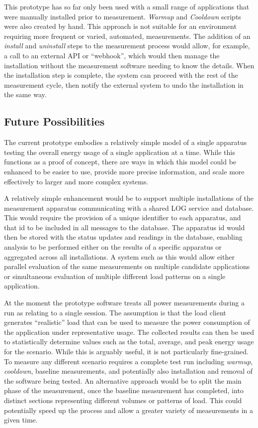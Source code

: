 This prototype has so far only been used with a small range of applications that were manually installed prior to measurement. \emph{Warmup} and \emph{Cooldown} scripts were also created by hand. This approach is not suitable for an environment requiring more frequent or varied, automated, measurements. The addition of an \emph{install} and \emph{uninstall} steps to the measurement process would allow, for example, a call to an external API or \enquote{webhook}, which would then manage the installation without the measurement software needing to know the details. When the installation step is complete, the system can proceed with the rest of the measurement cycle, then notify the external system to undo the installation in the same way.

\subsection{Future Possibilities}

The current prototype embodies a relatively simple model of a single apparatus testing the overall energy usage of a single application at a time. While this functions as a proof of concept, there are ways in which this model could be enhanced to be easier to use, provide more precise information, and scale more effectively to larger and more complex systems.

A relatively simple enhancement would be to support multiple installations of the measurement apparatus communicating with a shared LOG service and database. This would require the provision of a unique identifier to each apparatus, and that id to be included in all messages to the database. The apparatus id would then be stored with the status updates and readings in the database, enabling analysis to be performed either on the results of a specific apparatus or aggregated across all installations. A system such as this would allow either parallel evaluation of the same measurements on multiple candidate applications or simultaneous evaluation of multiple different load patterns on a single application.

At the moment the prototype software treats all power measurements during a run as relating to a single session. The assumption is that the load client generates \enquote{realistic} load that can be used to measure the power consumption of the application under representative usage. The collected results can then be used to statistically determine values such as the total, average, and peak energy usage for the scenario. While this is arguably useful, it is not particularly fine-grained. To measure any different scenario requires a complete test run including \emph{warmup}, \emph{cooldown}, baseline measurements, and potentially also installation and removal of the software being tested. An alternative approach would be to split the main phase of the measurement, once the baseline measurement has completed, into distinct sections representing different volumes or patterns of load. This could potentially speed up the process and allow a greater variety of measurements in a given time.


